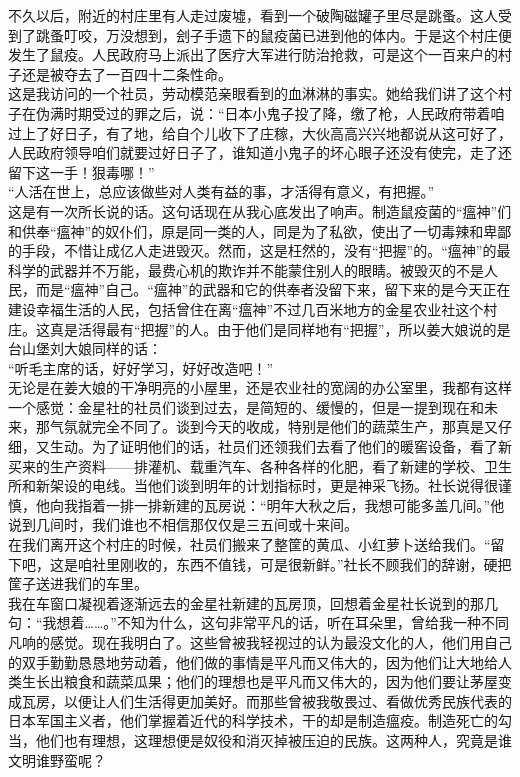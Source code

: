不久以后，附近的村庄里有人走过废墟，看到一个破陶磁罐子里尽是跳蚤。这人受到了跳蚤叮咬，万没想到，刽子手遗下的鼠疫菌已进到他的体内。于是这个村庄便发生了鼠疫。人民政府马上派出了医疗大军进行防治抢救，可是这个一百来户的村子还是被夺去了一百四十二条性命。\\

这是我访问的一个社员，劳动模范亲眼看到的血淋淋的事实。她给我们讲了这个村子在伪满时期受过的罪之后，说：“日本小鬼子投了降，缴了枪，人民政府带着咱过上了好日子，有了地，给自个儿收下了庄稼，大伙高高兴兴地都说从这可好了，人民政府领导咱们就要过好日子了，谁知道小鬼子的坏心眼子还没有使完，走了还留下这一手！狠毒哪！”\\

“人活在世上，总应该做些对人类有益的事，才活得有意义，有把握。”\\

这是有一次所长说的话。这句话现在从我心底发出了响声。制造鼠疫菌的“瘟神”们和供奉“瘟神”的奴仆们，原是同一类的人，同是为了私欲，使出了一切毒辣和卑鄙的手段，不惜让成亿人走进毁灭。然而，这是枉然的，没有“把握”的。“瘟神”的最科学的武器并不万能，最费心机的欺诈并不能蒙住别人的眼睛。被毁灭的不是人民，而是“瘟神”自己。“瘟神”的武器和它的供奉者没留下来，留下来的是今天正在建设幸福生活的人民，包括曾住在离“瘟神”不过几百米地方的金星农业社这个村庄。这真是活得最有“把握”的人。由于他们是同样地有“把握”，所以姜大娘说的是台山堡刘大娘同样的话：\\

“听毛主席的话，好好学习，好好改造吧！”\\

无论是在姜大娘的干净明亮的小屋里，还是农业社的宽阔的办公室里，我都有这样一个感觉：金星社的社员们谈到过去，是简短的、缓慢的，但是一提到现在和未来，那气氛就完全不同了。谈到今天的收成，特别是他们的蔬菜生产，那真是又仔细，又生动。为了证明他们的话，社员们还领我们去看了他们的暖窖设备，看了新买来的生产资料——排灌机、载重汽车、各种各样的化肥，看了新建的学校、卫生所和新架设的电线。当他们谈到明年的计划指标时，更是神采飞扬。社长说得很谨慎，他向我指着一排一排新建的瓦房说：“明年大秋之后，我想可能多盖几间。”他说到几间时，我们谁也不相信那仅仅是三五间或十来间。\\

在我们离开这个村庄的时候，社员们搬来了整筐的黄瓜、小红萝卜送给我们。“留下吧，这是咱社里刚收的，东西不值钱，可是很新鲜。”社长不顾我们的辞谢，硬把筐子送进我们的车里。\\

我在车窗口凝视着逐渐远去的金星社新建的瓦房顶，回想着金星社长说到的那几句：“我想着……。”不知为什么，这句非常平凡的话，听在耳朵里，曾给我一种不同凡响的感觉。现在我明白了。这些曾被我轻视过的认为最没文化的人，他们用自己的双手勤勤恳恳地劳动着，他们做的事情是平凡而又伟大的，因为他们让大地给人类生长出粮食和蔬菜瓜果；他们的理想也是平凡而又伟大的，因为他们要让茅屋变成瓦房，以便让人们生活得更加美好。而那些曾被我敬畏过、看做优秀民族代表的日本军国主义者，他们掌握着近代的科学技术，干的却是制造瘟疫。制造死亡的勾当，他们也有理想，这理想便是奴役和消灭掉被压迫的民族。这两种人，究竟是谁文明谁野蛮呢？\\

